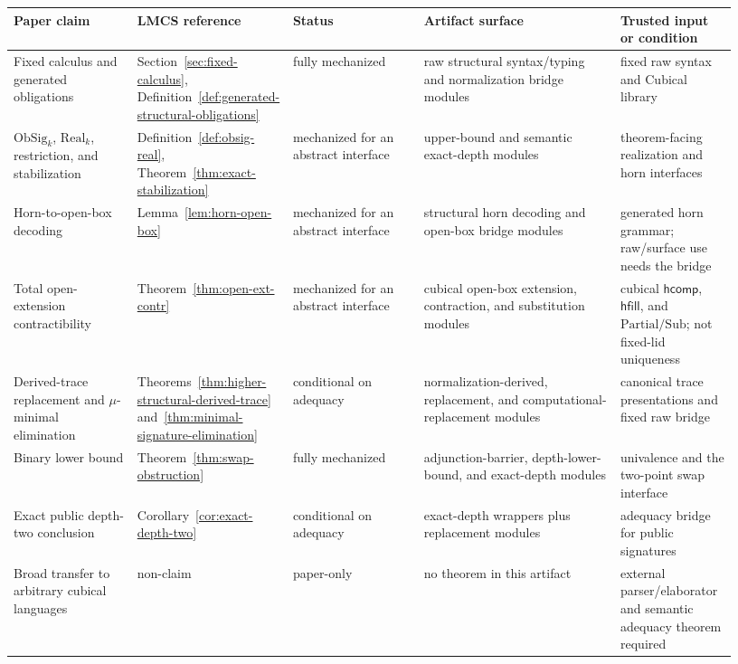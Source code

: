 \documentclass{lmcs}
\begin{document}
\begin{center}
\scriptsize
\setlength{\tabcolsep}{2pt}
\begin{tabular}{p{0.17\linewidth}p{0.15\linewidth}p{0.18\linewidth}p{0.27\linewidth}p{0.16\linewidth}}
\hline
Paper claim & LMCS reference & Status & Artifact surface & Trusted input or condition \\
\hline
Fixed calculus and generated obligations
& Section~\ref{sec:fixed-calculus}, Definition~\ref{def:generated-structural-obligations}
& fully mechanized
& raw structural syntax/typing and normalization bridge modules
& fixed raw syntax and Cubical library \\
\hline
\(\mathrm{ObSig}_k\), \(\mathrm{Real}_k\), restriction, and stabilization
& Definition~\ref{def:obsig-real}, Theorem~\ref{thm:exact-stabilization}
& mechanized for an abstract interface
& upper-bound and semantic exact-depth modules
& theorem-facing realization and horn interfaces \\
\hline
Horn-to-open-box decoding
& Lemma~\ref{lem:horn-open-box}
& mechanized for an abstract interface
& structural horn decoding and open-box bridge modules
& generated horn grammar; raw/surface use needs the bridge \\
\hline
Total open-extension contractibility
& Theorem~\ref{thm:open-ext-contr}
& mechanized for an abstract interface
& cubical open-box extension, contraction, and substitution modules
& cubical \(\mathsf{hcomp}\), \(\mathsf{hfill}\), and \(\mathrm{Partial}/\mathrm{Sub}\);
not fixed-lid uniqueness \\
\hline
Derived-trace replacement and \(\mu\)-minimal elimination
& Theorems~\ref{thm:higher-structural-derived-trace}
and~\ref{thm:minimal-signature-elimination}
& conditional on adequacy
& normalization-derived, replacement, and computational-replacement modules
& canonical trace presentations and fixed raw bridge \\
\hline
Binary lower bound
& Theorem~\ref{thm:swap-obstruction}
& fully mechanized
& adjunction-barrier, depth-lower-bound, and exact-depth modules
& univalence and the two-point swap interface \\
\hline
Exact public depth-two conclusion
& Corollary~\ref{cor:exact-depth-two}
& conditional on adequacy
& exact-depth wrappers plus replacement modules
& adequacy bridge for public signatures \\
\hline
Broad transfer to arbitrary cubical languages
& non-claim
& paper-only
& no theorem in this artifact
& external parser/elaborator and semantic adequacy theorem required \\
\hline
\end{tabular}
\end{center}
\end{document}
